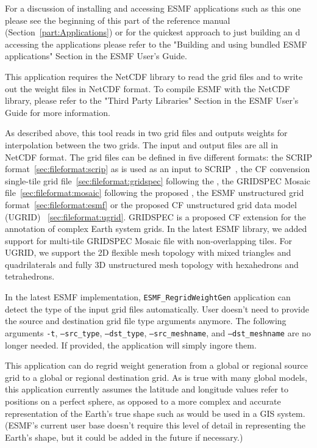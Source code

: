 For a discussion of installing and accessing ESMF applications such as this one please see the beginning of this part of the reference manual (Section~\ref{part:Applications}) or for the quickest approach to just building an d accessing the applications please refer to the "Building and using bundled ESMF applications" Section in the ESMF User's Guide.

This application requires the NetCDF library to read the grid files and to write out the weight files in NetCDF format.  To compile ESMF with the NetCDF library, please refer to the "Third Party Libraries" Section in the ESMF User's Guide for more information.

As described above, this tool reads in
two grid files and outputs weights for interpolation
 between the two grids. The input and output files are all in NetCDF format. The grid files can be defined in five
different formats:  the SCRIP format~\ref{sec:fileformat:scrip} as is used as an input to SCRIP~\cite{ref:SCRIP}, the CF convension single-tile grid file~\ref{sec:fileformat:gridspec} following the
, the GRIDSPEC Mosaic file~\ref{sec:fileformat:mosaic} following the proposed ,  
the ESMF unstructured grid format~\ref{sec:fileformat:esmf} or the proposed CF unstructured grid data model (UGRID) ~\ref{sec:fileformat:ugrid}.  GRIDSPEC is a proposed CF extension for the annotation of complex Earth system grids.  In the latest ESMF library, we added support for multi-tile GRIDSPEC Mosaic file with non-overlapping tiles. For UGRID, we support the 2D flexible mesh topology with mixed triangles and quadrilaterals and fully 3D unstructured mesh topology with hexahedrons and tetrahedrons.  

In the latest ESMF implementation,  {\tt ESMF\_RegridWeightGen} application can detect the type of the input grid files automatically.  User
doesn't need to provide the source and destination grid file type arguments anymore.  The following arguments {\tt -t}, {\tt --src\_type}, {\tt --dst\_type}, {\tt --src\_meshname}, and {\tt --dst\_meshname} are no longer needed.  If provided, the application will simply ingore them.

 This application can do regrid weight generation from a global or regional source grid to a global or regional destination grid.
As is true with many global models, this application currently assumes the latitude and longitude values refer to positions on a perfect sphere, as opposed to a more complex and accurate representation of the Earth's true shape such as would be used in a GIS system. (ESMF's current user base doesn't require this level of detail in representing the Earth's shape, but it could be added in the future if necessary.)

